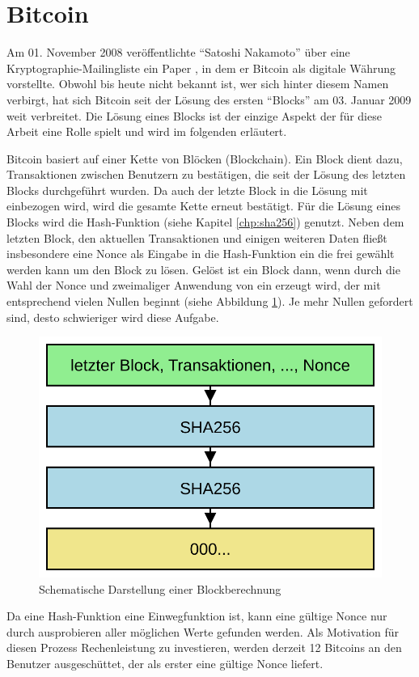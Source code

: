 \section{Bitcoin}
\label{sec:bitcoin}

Am 01. November 2008 veröffentlichte "`Satoshi Nakamoto"' über eine Kryptographie-Mailingliste \cite{bitcoinmailinglist} ein Paper \cite{bitcoinpaper},
in dem er Bitcoin als digitale Währung vorstellte. Obwohl bis heute nicht bekannt ist, wer sich hinter diesem Namen verbirgt, hat sich Bitcoin seit der
Lösung des ersten "`Blocks"' am 03. Januar 2009 \cite{bitcoinblock0} weit verbreitet. Die Lösung eines Blocks ist der einzige Aspekt der für
diese Arbeit eine Rolle spielt und wird im folgenden erläutert.

Bitcoin basiert auf einer Kette von Blöcken (Blockchain). Ein Block dient dazu, Transaktionen zwischen Benutzern zu bestätigen, die seit der Lösung
des letzten Blocks durchgeführt wurden. Da auch der letzte Block in die Lösung mit einbezogen wird, wird die gesamte Kette erneut bestätigt.
Für die Lösung eines Blocks wird die Hash-Funktion  (siehe Kapitel \ref{chp:sha256}) genutzt. Neben dem letzten Block, den aktuellen Transaktionen
und einigen weiteren Daten fließt insbesondere eine Nonce als Eingabe in die Hash-Funktion ein die frei gewählt werden kann um den Block zu lösen. Gelöst ist ein
Block dann, wenn durch die Wahl der Nonce und zweimaliger Anwendung von  ein  erzeugt wird, der mit entsprechend vielen Nullen beginnt
(siehe Abbildung \ref{fig:bitcoin}). Je mehr Nullen gefordert sind, desto schwieriger wird diese Aufgabe.

\begin{figure}[!h]
  \centering
  \includegraphics[scale=0.4]{images/bitcoin}
  \caption{Schematische Darstellung einer Blockberechnung}
  \label{fig:bitcoin}
\end{figure}

Da eine Hash-Funktion eine Einwegfunktion ist, kann eine gültige Nonce nur durch ausprobieren aller möglichen Werte gefunden werden. Als Motivation
für diesen Prozess Rechenleistung zu investieren, werden derzeit 12 Bitcoins an den Benutzer ausgeschüttet, der als erster eine gültige Nonce liefert.



